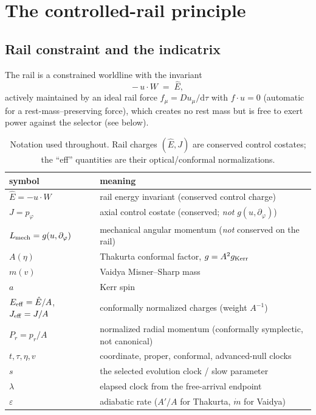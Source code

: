 \documentclass[12pt]{iopart}
\newcommand{\Ehat}{\hat E}
\newcommand{\dd}{\mathrm{d}}
\begin{document}
\section{The controlled-rail principle}
\label{sec:principle}

\subsection{Rail constraint and the indicatrix}
\label{sec:indicatrix}
The rail is a constrained worldline with the invariant
\begin{equation}
    -\,u\cdot W \;=\; \Ehat ,
    \label{eq:rail}
\end{equation}
actively maintained by an ideal rail force $f_\mu=Du_\mu/\dd\tau$ with
$f\cdot u=0$ (automatic for a rest-mass--preserving force), which creates no rest
mass but is free to exert power against the selector (see below).

\begin{table}[htbp]
    \centering\small
    \caption{Notation used throughout. Rail charges $(\Ehat,J)$ are conserved control
    costates; the ``eff'' quantities are their optical/conformal normalizations.}
    \label{tab:notation}
    \begin{tabular}{@{}ll@{}}
        \hline\hline
        symbol & meaning\\
        \hline
        $\Ehat=-u\cdot W$ & rail energy invariant (conserved control charge)\\
        $J=p_\varphi$ & axial control costate (conserved; \emph{not} $g(u,\partial_\varphi)$)\\
        $L_{\rm mech}=g(u,\partial_\varphi)$ & mechanical angular momentum (\emph{not} conserved on the rail)\\
        $A(\eta)$ & Thakurta conformal factor, $g=A^2 g_{\rm Kerr}$\\
        $m(v)$ & Vaidya Misner--Sharp mass\\
        $a$ & Kerr spin\\
        $E_{\rm eff}=\Ehat/A$, $J_{\rm eff}=J/A$ & conformally normalized charges (weight $A^{-1}$)\\
        $P_r=p_r/A$ & normalized radial momentum (conformally symplectic, not canonical)\\
        $t,\tau,\eta,v$ & coordinate, proper, conformal, advanced-null clocks\\
        $s$ & the selected evolution clock / slow parameter\\
        $\lambda$ & elapsed clock from the free-arrival endpoint\\
        $\varepsilon$ & adiabatic rate ($A'/A$ for Thakurta, $\dot m$ for Vaidya)\\
        \hline\hline
    \end{tabular}
\end{table}
\end{document}
